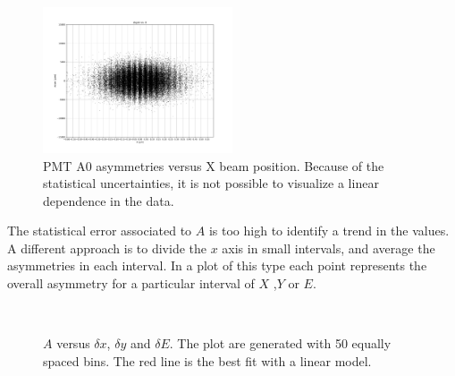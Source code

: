 \begin{figure}[hbtp]
\centering
\includegraphics[width = 0.5\textwidth]{Analysis/Fit/A_vs_X.pdf}
\caption{PMT A0 asymmetries versus X beam position. Because of the statistical uncertainties, it is not possible to visualize a linear dependence in the data.}
\label{fig:AsymmetryA0vrX}
\end{figure}

The statistical error associated to $A$ is too high to identify a trend in the values. A different approach is to divide the $x$ axis in small intervals, and average the asymmetries in each interval. In a plot of this type each point represents the overall asymmetry for a particular interval of $X$ ,$Y$ or $E$.
 
\begin{figure}[hbtp]
\centering
{}
\\
\caption{ $A$ versus $\delta x$, $\delta y$ and $\delta E$. The plot are generated with 50 equally spaced bins. The red line is the best fit with a linear model.}
\end{figure} 

